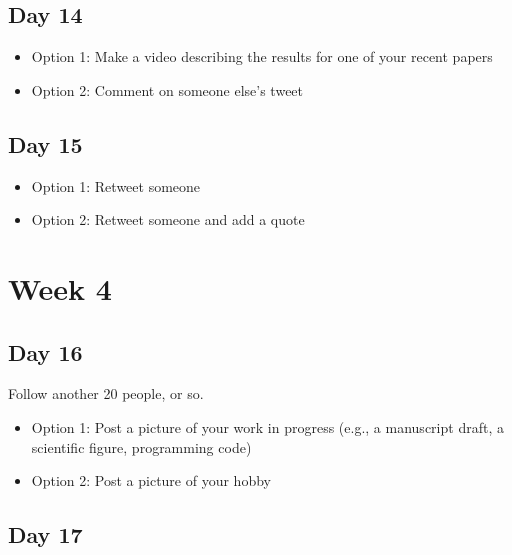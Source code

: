 \documentclass[
]{book}
\providecommand{\tightlist}{%
  \setlength{\itemsep}{0pt}\setlength{\parskip}{0pt}}
\begin{document}
\hypertarget{day-14}{%
\subsection*{Day 14}\label{day-14}}

\begin{itemize}
\tightlist
\item
  Option 1: Make a video describing the results for one of your recent papers
\item
  Option 2: Comment on someone else's tweet
\end{itemize}

\hypertarget{day-15}{%
\subsection*{Day 15}\label{day-15}}

\begin{itemize}
\tightlist
\item
  Option 1: Retweet someone
\item
  Option 2: Retweet someone and add a quote
\end{itemize}

\hypertarget{week-4}{%
\section*{Week 4}\label{week-4}}

\hypertarget{day-16}{%
\subsection*{Day 16}\label{day-16}}

Follow another 20 people, or so.

\begin{itemize}
\tightlist
\item
  Option 1: Post a picture of your work in progress (e.g., a manuscript draft, a scientific figure, programming code)
\item
  Option 2: Post a picture of your hobby
\end{itemize}

\hypertarget{day-17}{%
\subsection*{Day 17}\label{day-17}}
\end{document}
